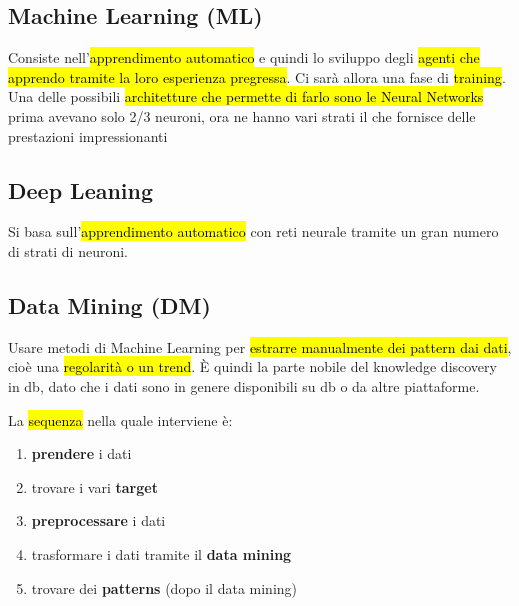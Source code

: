 \subsection{Machine Learning (ML)}

Consiste nell'\hl{apprendimento automatico} e quindi lo sviluppo degli \hl{agenti che apprendo tramite la loro esperienza pregressa}. Ci sarà allora una fase di \hl{training}.
Una delle possibili \hl{architetture che permette di farlo sono le Neural Networks} prima avevano solo 2/3 neuroni, ora ne hanno vari strati il che fornisce delle prestazioni impressionanti


\subsection{Deep Leaning}

Si basa sull'\hl{apprendimento automatico} con reti neurale tramite un gran numero di strati di neuroni.


\subsection{Data Mining (DM)}

Usare metodi di Machine Learning per \hl{estrarre manualmente dei pattern dai dati}, cioè una \hl{regolarità o un trend}. È quindi la parte nobile del knowledge discovery in db, dato che i dati sono in genere disponibili su db o da altre piattaforme.

La \hl{sequenza} nella quale interviene è:
\begin{enumerate}
	\item \textbf{prendere} i dati
	\item trovare i vari \textbf{target}
	\item \textbf{preprocessare} i dati
	\item trasformare i dati tramite il \textbf{data mining}
	\item trovare dei \textbf{patterns} (dopo il data mining)
\end{enumerate}

































